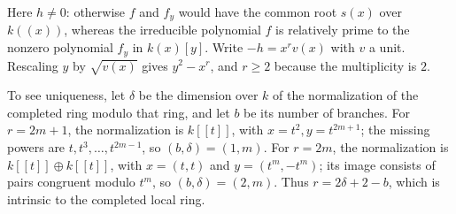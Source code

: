Here $h\ne0$: otherwise $f$ and $f_y$ would have the common root $s(x)$ over $k((x))$, whereas the irreducible polynomial $f$ is relatively prime to the nonzero polynomial $f_y$ in $k(x)[y]$. Write $-h=x^rv(x)$ with $v$ a unit. Rescaling $y$ by $\sqrt{v(x)}$ gives $y^2-x^r$, and $r\geq2$ because the multiplicity is $2$.

To see uniqueness, let $\delta$ be the dimension over $k$ of the normalization of the completed ring modulo that ring, and let $b$ be its number of branches. For $r=2m+1$, the normalization is $k[[t]]$, with $x=t^2,y=t^{2m+1}$; the missing powers are $t,t^3,\ldots,t^{2m-1}$, so $(b,\delta)=(1,m)$. For $r=2m$, the normalization is $k[[t]]\oplus k[[t]]$, with $x=(t,t)$ and $y=(t^m,-t^m)$; its image consists of pairs congruent modulo $t^m$, so $(b,\delta)=(2,m)$. Thus $r=2\delta+2-b$, which is intrinsic to the completed local ring.
